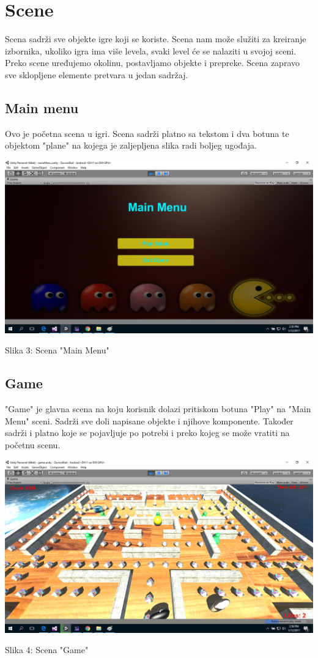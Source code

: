 \section{Scene}

Scena sadrži sve objekte igre koji se koriste. Scena nam može služiti za kreiranje izbornika, ukoliko igra ima više levela, svaki level će se nalaziti u svojoj sceni. Preko scene uređujemo okolinu, postavljamo objekte i prepreke. Scena zapravo sve sklopljene elemente pretvara u jedan sadržaj. 
\subsection{Main menu}
Ovo je početna scena u igri. Scena sadrži platno sa tekstom i dva botuna te objektom "plane" na kojega je zaljepljena slika radi boljeg ugođaja. 

\begin{center}
	\includegraphics[scale=0.20]{scena1.png}
	
	Slika 3: Scena "Main Menu"
\end{center}




\subsection{Game}
"Game" je glavna scena na koju korisnik dolazi pritiskom botuna "Play" na "Main Menu" sceni. Sadrži sve doli napisane objekte i njihove komponente. Također sadrži i platno koje se pojavljuje po potrebi i preko kojeg se može vratiti na početnu scenu.
\begin{center}
\includegraphics[scale=0.20]{scena2.png}

Slika 4: Scena "Game"
\end{center}
